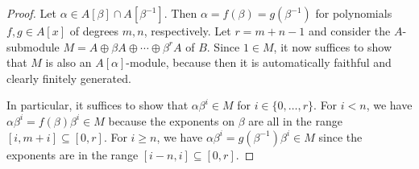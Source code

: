 \begin{proof}
	Let $\alpha \in A[\beta] \cap A[\beta^{-1}]$. Then $\alpha = f(\beta) = g(\beta^{-1})$ for polynomials $f,g \in A[x]$ of degrees $m,n$, respectively. Let $r = m+n-1$ and consider the $A$-submodule $M = A \oplus \beta A \oplus \cdots \oplus \beta^rA$ of $B$. Since $1 \in M$, it now suffices to show that $M$ is also an $A[\alpha]$-module, because then it is automatically faithful and clearly finitely generated.
	
	In particular, it suffices to show that $\alpha\beta^i \in M$ for $i \in \{0,\ldots,r\}$. For $i < n$, we have $\alpha\beta^i = f(\beta)\beta^i \in M$ because the exponents on $\beta$ are all in the range $[i,m+i] \subseteq [0,r]$. For $i \geq n$, we have $\alpha\beta^i = g(\beta^{-1})\beta^i \in M$ since the exponents are in the range $[i-n,i] \subseteq [0,r]$.
\end{proof}
